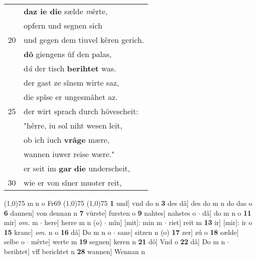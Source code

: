 \documentclass[8pt,a4paper,notitlepage]{article}
\begin{document}
\begin{table}[ht]
\begin{minipage}[t]{0.5\linewidth}
\begin{tabular}{rl}
 & \textbf{daz ie die} sælde \textit{m}êrte,\\ 
 & opfern und segnen sich\\ 
20 & und gegen dem tiuvel kêren gerich.\\ 
 & \textbf{dô} giengens ûf den palas,\\ 
 & d\textit{â} der tisch \textbf{berihtet} was.\\ 
 & der gast ze sînem wirte saz,\\ 
 & die spîse er ungesmâhet az.\\ 
25 & der wirt sprach durch hövescheit:\\ 
 & "hêrre, iu sol niht wesen leit,\\ 
 & ob ich iuch \textbf{vrâge} mære,\\ 
 & wannen iuwer reise wære."\\ 
 & er seit im \textbf{gar} \textbf{die} underscheit,\\ 
30 & wie er von sîner muoter reit,\\ 
\end{tabular}
\scriptsize
\line(1,0){75} \newline
m n o Fr69 \newline
\line(1,0){75} \newline
\newline
\line(1,0){75} \newline
\textbf{1} und] vnd do n \textbf{3} des dâ] des do m n do das o \textbf{6} dannen] von dennan n \textbf{7} vürste] fursten o \textbf{9} nahtes] nahstes o  $\cdot$ dâ] do m n o \textbf{11} mir] \textit{om.} m  $\cdot$ here] herre m n (o)  $\cdot$ mîn] [mit]: min m  $\cdot$ riet] reit m \textbf{13} ir] [mir]: ir o \textbf{15} kranc] \textit{om.} n o \textbf{16} dâ] Do m n o  $\cdot$ sanc] sitzen n (o) \textbf{17} zer] zú o \textbf{18} sælde] selbe o  $\cdot$ mêrte] werte m \textbf{19} segnen] keren n \textbf{21} dô] Vnd o \textbf{22} dâ] Do m n  $\cdot$ berihtet] vff berichtet n \textbf{28} wannen] Wennan n \newline
\end{minipage}
\end{table}
\newpage
\end{document}
